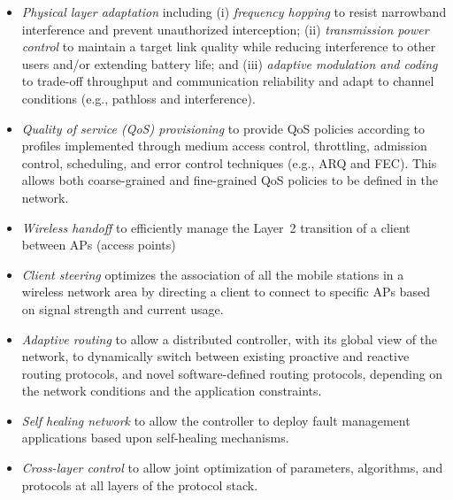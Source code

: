 \begin{itemize}
\item \emph{Physical layer adaptation} including (i) \emph{frequency hopping} to resist narrowband interference and prevent unauthorized interception; (ii) \emph{transmission power control} to maintain a target link quality while reducing interference to other users and/or extending battery life; and (iii) \emph{adaptive modulation and coding} to trade-off throughput and communication reliability and adapt to channel conditions (e.g., pathloss and interference). %

\item \emph{Quality of service (QoS) provisioning} to provide QoS policies according to profiles implemented through medium access control, throttling, admission control, scheduling, and error control techniques (e.g., ARQ and FEC). This allows both coarse-grained and fine-grained QoS policies to be defined in the network.

\item \emph{Wireless handoff} to efficiently manage the Layer~2 transition of a client between APs (access points)

\item \emph{Client steering} optimizes the association of all the mobile stations in a wireless network area by directing a client to connect to specific APs based on signal strength and current usage.

\item \emph{Adaptive routing} to allow a distributed controller, with its global view of the network, to dynamically switch between existing proactive and reactive routing protocols, and novel software-defined routing protocols, depending on the network conditions and the application constraints.


\item \emph{Self healing network} to allow the controller to deploy fault management applications based upon self-healing mechanisms.

\item \emph{Cross-layer control} to allow joint optimization of parameters, algorithms, and protocols at all layers of the protocol stack.
\end{itemize}

